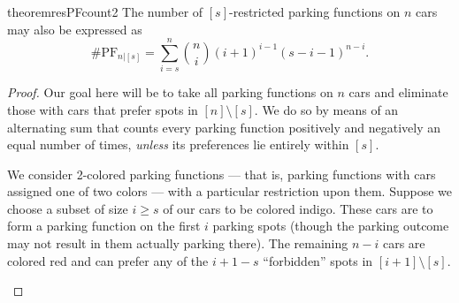 \documentclass[12 pt]{amsart}
\theoremstyle{definition} %
\theoremstyle{remark} %
\newcommand{\mzncarrot}[4][(0,0)]{
    \begin{scope}[shift={#1}]
    \shade[top color=#2, bottom color=#2, shading angle=90, draw=#2!90!black, rounded corners=0.5ex, thick] (0.5,0.25) -- ++(0,1.5+.25) -- ++(0.5,0.25) -- ++(1.5,0) -- ++(1,-.5) -- ++(0,-1.45) -- cycle;
    \draw[thick, rounded corners=0.2ex, fill=white, thick] (1,2.1) -- ++(0.5,0.45) -- ++(0.8,0) -- ++(0.3,-0.45) -- cycle;
    \draw[thick] (2.1-.25,2.1) -- ++(0,.45);
    \if\relax\detokenize{#3}\relax 
    \else
    \draw[fill=#2!20, thin, draw = #2] (2.1-.25,1.3) circle[radius=.65] 
        node [anchor = center, rotate = #4]{\small #3};
    \fi
    \draw[fill=gray!80,thin] (1.375-.25,.25) circle[radius=.2];
    \draw[fill=gray!80,thin] (2.76-.25,.25) circle[radius=.2];
    \end{scope}
}
\newcommand{\mzncar}[3][(0,0)]{
    \mzncarrot[#1]{#2}{#3}{0}
}
\begin{document}
\begin{restatable}{theorem}{resPFcount2}
    \label{thm:resPFcount2}
    The number of $[s]$-restricted parking functions on $n$ cars may also be expressed as
    \[\#\mathrm{PF}_{n|[s]}=\sum_{i = s}^{n} \binom{n}{i} (i + 1)^{i - 1} (s - i - 1)^{n - i}.\]
\end{restatable}

\begin{proof}
    Our goal here will be to take all parking functions on $n$ cars and eliminate those with cars that prefer spots in $[n] \setminus [s]$. We do so by means of an alternating sum that counts every parking function positively and negatively an equal number of times, \textit{unless} its preferences lie entirely within $[s].$

	We consider 2-colored parking functions --- that is, parking functions with cars assigned one of two colors --- with a particular restriction upon them.  Suppose we choose a subset of size $i \ge s$ of our cars to be colored indigo. These cars are to form a parking function on the first $i$ parking spots (though the parking outcome may not result in them actually parking there). The remaining $n - i$ cars are colored red and can prefer any of the $i + 1 - s$ ``forbidden'' spots in  $[i + 1] \setminus [s]$.
    

\begin{figure}[h]
\begin{center}
\end{center}
\end{figure}
\end{proof}
\end{document}
